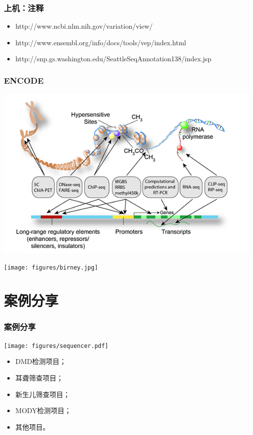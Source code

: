 \documentclass[12pt]{beamer}
\begin{document}
\begin{frame}\frametitle{上机：注释}
  \small{
  \begin{itemize}
    \item http://www.ncbi.nlm.nih.gov/variation/view/
    \item http://www.ensembl.org/info/docs/tools/vep/index.html
    \item http://snp.gs.washington.edu/SeattleSeqAnnotation138/index.jsp
  \end{itemize}
  }
\end{frame}
\begin{frame}\frametitle{ENCODE}
  \includegraphics[width=\textwidth]{figures/encode.png}  
\end{frame}

\begin{frame}
  \texttt{[image: figures/birney.jpg]}  
\end{frame}


\section{案例分享}
\begin{frame}\frametitle{案例分享}
  \texttt{[image: figures/sequencer.pdf]}    
  \begin{itemize}
  \item DMD检测项目；
  \item 耳聋筛查项目；
  \item 新生儿筛查项目；
  \item MODY检测项目；
  \item 其他项目。
  \end{itemize}
\end{frame}
\end{document}
